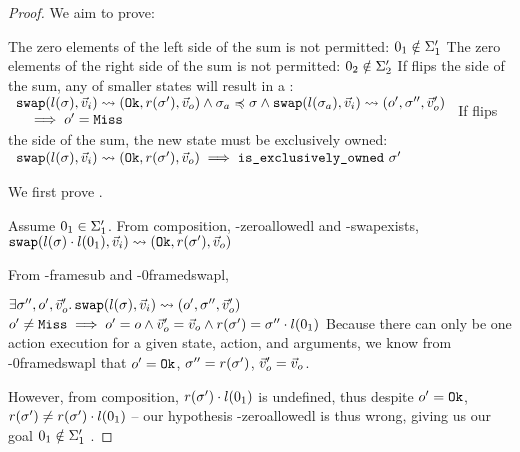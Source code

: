 \begin{proof}
We aim to prove:
\begin{goalvlist}
     The zero elements of the left side of the sum is not permitted: $0_1\notin \Sigma_1'$
     The zero elements of the right side of the sum is not permitted: $0_2\notin \Sigma_2'$
     If \swap{} flips the side of the sum, any \swap{} of smaller states will result in a \Miss: \\
    $\begin{array}{l}
    	\texttt{swap}(l(\sigma),\vec{v}_i)\rightsquigarrow(\texttt{Ok},r(\sigma'),\vec{v}_o)\land \sigma_a \preccurlyeq \sigma \land \texttt{swap}(l(\sigma_a),\vec{v}_i)\rightsquigarrow(o',\sigma'',\vec{v}_o') \\
    	\quad\implies o' = \texttt{Miss}
    \end{array}$
     If \swap{} flips the side of the sum, the new state must be exclusively owned:\\
    $\begin{array}{l}
    	\texttt{swap}(l(\sigma),\vec{v}_i)\rightsquigarrow(\texttt{Ok},r(\sigma'),\vec{v}_o) \implies \texttt{is\_exclusively\_owned}~\sigma'
    \end{array}$

\end{goalvlist}



We first prove .

\begin{hypvlist}
	 Assume $0_1\in \Sigma_1'$.
	 From composition, \hyp{zeroallowedl} and \hyp{swapexists}, $\texttt{swap}(l(\sigma)\cdot l(0_1),\vec{v}_i)\rightsquigarrow(\texttt{Ok},r(\sigma'),\vec{v}_o)$
\end{hypvlist}

From \hyp{framesub} and \hyp{0framedswapl},
\begin{hypvlist}
	 $\exists \sigma'', o', \vec{v}_o'\ldotp \texttt{swap}(l(\sigma),\vec{v}_i)\rightsquigarrow(o', \sigma'', \vec{v}_o')$
	 $o' \neq \texttt{Miss} \implies o' = o \land  \vec{v}_o' = \vec{v}_o \land r(\sigma') = \sigma'' \cdot l(0_1)$
	 Because there can only be one action execution for a given state, action, and arguments, we know from \hyp{0framedswapl} that $o'=\texttt{Ok}$, $\sigma''=r(\sigma')$, $\vec{v}_o'=\vec{v}_o$.
\end{hypvlist}

However, from composition, $r(\sigma')\cdot l(0_1)$ is undefined, thus despite $o'=\texttt{Ok}$, $r(\sigma')\neq r(\sigma')\cdot l(0_1)$ -- our hypothesis \hyp{zeroallowedl} is thus wrong, giving us our goal $0_1\notin \Sigma_1'$ .


\end{proof}
